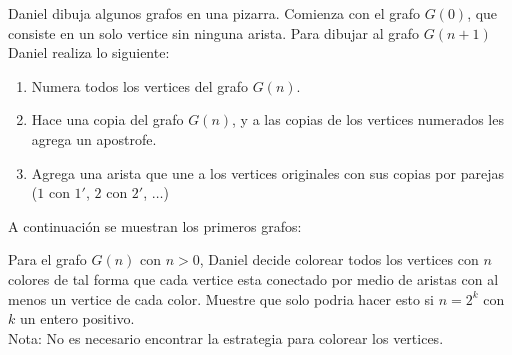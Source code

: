 \begin{problem}
    Daniel dibuja algunos grafos en una pizarra. Comienza con el grafo $G(0)$, que consiste en un solo vertice sin
    ninguna arista. Para dibujar al grafo $G(n+1)$ Daniel realiza lo siguiente:
    \begin{enumerate}
        \item Numera todos los vertices del grafo $G(n)$.
        \item Hace una copia del grafo $G(n)$, y a las copias de los vertices numerados les agrega un apostrofe.
        \item Agrega una arista que une a los vertices originales con sus copias por parejas ($1$ con $1'$, $2$ con $2'$, $\ldots$)
    \end{enumerate}
    A continuaci\'on se muestran los primeros grafos:

    \begin{center}
    \end{center}
    
    Para el grafo $G(n)$ con $n>0$, Daniel decide colorear todos los vertices con $n$ colores de tal forma que cada 
    vertice esta conectado por medio de aristas con al menos un vertice de cada color. Muestre que solo podria hacer 
    esto si $n=2^k$ con $k$ un entero positivo. \\
    Nota: No es necesario encontrar la estrategia para colorear los vertices.
\end{problem}